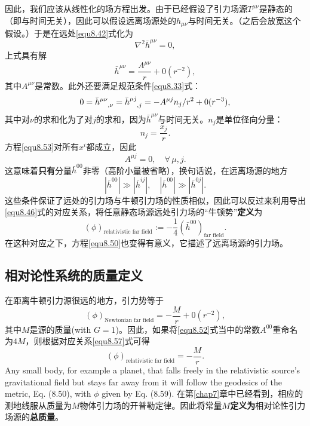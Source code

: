 因此，我们应该从线性化的场方程出发。由于已经假设了引力场源$T^{\mu \nu}$是静态的（即与时间无关），因此可以假设远离场源处的$h_{\mu \nu}$与时间无关。（之后会放宽这个假设。）于是在远处\eqref{equ8.42}式化为
\begin{equation}
    \nabla^2 \bar{h}^{\mu \nu} = 0, \label{equ8.51}
\end{equation}
上式具有解
\begin{equation}
    \bar{h}^{\mu \nu} = \frac{A^{\mu \nu}}{r} + 0(r^{-2}), \label{equ8.52}
\end{equation}
其中$A^{\mu \nu}$是常数。此外还要满足规范条件\eqref{equ8.33}式：
\begin{equation}
    0 = \bar{h}\indices{^{\mu \nu}_{, \nu}} = \bar{h}\indices{^{\mu j}_{, j}} = -A^{\mu j} n_j / r^2 + 0(r^{-3}), \label{equ8.53}
\end{equation}
其中对$\nu$的求和化为了对$j$的求和，因为$\bar{h}^{\mu \nu}$与时间无关。$n_j$是单位径向分量：
\begin{equation}
    n_j = \frac{x_j}{r}. \label{equ8.54}
\end{equation}
方程\eqref{equ8.53}对所有$x^i$都成立，因此
\begin{equation}
    A^{\mu j} = 0, \quad \forall\, \mu , j. \label{equ8.55}
\end{equation}
这意味着\textbf{只有}分量$\bar{h}^{00}$非零（高阶小量被省略），换句话说，在远离场源的地方
\begin{equation}
    |\bar{h}^{00}| \gg |\bar{h}^{ij}|, \quad |\bar{h}^{00}| \gg |\bar{h}^{0j}|. \label{equ8.56}
\end{equation}
这些条件保证了远处的引力场与牛顿引力场的性质相似，因此可以反过来利用导出\eqref{equ8.46}式的对应关系，将任意静态场源远处引力场的“牛顿势”\textbf{定义}为
\begin{equation}
    (\phi)_{\text{relativistic far field}} := -\frac{1}{4} (\bar{h}^{00})_{\text{far field}}. \label{equ8.57}
\end{equation}
在这种对应之下，方程\eqref{equ8.50}也变得有意义，它描述了远离场源的引力场。

\subsection*{相对论性系统的质量定义}
在距离牛顿引力源很远的地方，引力势等于
\begin{equation}
    (\phi)_{\text{Newtonian far field}} = -\frac{M}{r} + 0(r^{-2}), \label{equ8.58}
\end{equation}
其中$M$是源的质量(with $G = 1$)。因此，如果将\eqref{equ8.52}式当中的常数$A^{00}$重命名为$4M$，则根据对应关系\eqref{equ8.57}式可得
\begin{equation}
    (\phi)_{\text{relativistic far field}} = -\frac{M}{r}. \label{equ8.59}
\end{equation}
Any small body, for example a planet, that falls freely in the relativistic source's gravitational field but stays far away from it will follow the geodesics of the metric, Eq. (8.50), with $\phi$ given by Eq. (8.59). 在第\ref{chap7}章中已经看到，相应的测地线服从质量为$M$物体引力场的开普勒定律。因此将常量$M$\textbf{定义为}相对论性引力场源的\textbf{总质量}。

